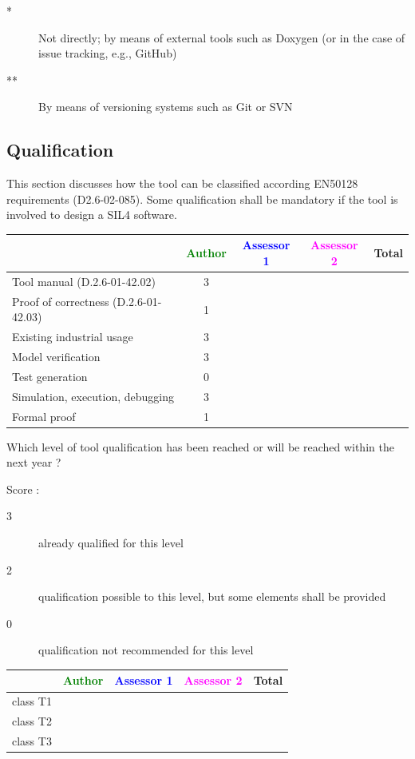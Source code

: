 \begin{author_comment}
\begin{description}
\item[*] Not directly; by means of external tools such as Doxygen (or in the case of issue tracking, e.g., GitHub)
\item[**] By means of versioning systems such as Git or SVN
\end{description}
\end{author_comment}

\subsection{Qualification}

This section discusses how the tool can be classified according EN50128 requirements (D2.6-02-085). Some qualification shall be mandatory  if the tool is involved to design a SIL4 software.


\begin{tabular}{|l | c | c | c | c|}
\hline
& \textcolor{green}{Author} & \textcolor{blue}{Assessor 1} & \textcolor{magenta}{Assessor 2} & Total \\
\hline 
Tool manual (D.2.6-01-42.02) &3 & & &  \\
\hline
Proof of correctness (D.2.6-01-42.03)   &1 & & & \\
\hline
Existing industrial  usage  &3 & & & \\
\hline
Model verification &3 & & & \\
\hline
Test generation &0 & & & \\
\hline
Simulation, execution, debugging &3 & & & \\
\hline
Formal proof &1 & & & \\
\hline
\end{tabular}


Which level of tool qualification has been reached or will be reached within the next year ?

Score :
\begin{description}
\item[3] already qualified for this level
\item[2] qualification possible to this level, but some elements shall be provided
\item[0] qualification not recommended for this level
\end{description}


\begin{tabular}{|l | c | c | c | c|}
\hline
& \textcolor{green}{Author} & \textcolor{blue}{Assessor 1} & \textcolor{magenta}{Assessor 2} & Total \\
\hline 
class T1 & & & &  \\
\hline
class T2   & & & & \\
\hline
class T3  & & & & \\
\hline
\end{tabular}

